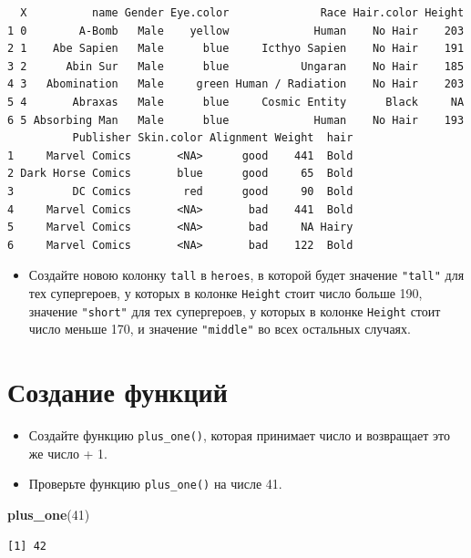 \documentclass[
]{book}
\newenvironment{Shaded}{\begin{snugshade}}{\end{snugshade}}
\newcommand{\DecValTok}[1]{\textcolor[rgb]{0.00,0.00,0.81}{#1}}
\newcommand{\KeywordTok}[1]{\textcolor[rgb]{0.13,0.29,0.53}{\textbf{#1}}}
\newcommand{\NormalTok}[1]{#1}
\providecommand{\tightlist}{%
  \setlength{\itemsep}{0pt}\setlength{\parskip}{0pt}}
\begin{document}
\begin{verbatim}
  X          name Gender Eye.color              Race Hair.color Height
1 0        A-Bomb   Male    yellow             Human    No Hair    203
2 1    Abe Sapien   Male      blue     Icthyo Sapien    No Hair    191
3 2      Abin Sur   Male      blue           Ungaran    No Hair    185
4 3   Abomination   Male     green Human / Radiation    No Hair    203
5 4       Abraxas   Male      blue     Cosmic Entity      Black     NA
6 5 Absorbing Man   Male      blue             Human    No Hair    193
          Publisher Skin.color Alignment Weight  hair
1     Marvel Comics       <NA>      good    441  Bold
2 Dark Horse Comics       blue      good     65  Bold
3         DC Comics        red      good     90  Bold
4     Marvel Comics       <NA>       bad    441  Bold
5     Marvel Comics       <NA>       bad     NA Hairy
6     Marvel Comics       <NA>       bad    122  Bold
\end{verbatim}

\begin{itemize}
\tightlist
\item
  Создайте новою колонку \texttt{tall} в \texttt{heroes}, в которой будет значение \texttt{"tall"} для тех супергероев, у которых в колонке \texttt{Height} стоит число больше 190, значение \texttt{"short"} для тех супергероев, у которых в колонке \texttt{Height} стоит число меньше 170, и значение \texttt{"middle"} во всех остальных случаях.
\end{itemize}

\hypertarget{task_function}{%
\section{Создание функций}\label{task_function}}

\begin{itemize}
\item
  Создайте функцию \texttt{plus\_one()}, которая принимает число и возвращает это же число + 1.
\item
  Проверьте функцию \texttt{plus\_one()} на числе 41.
\end{itemize}

\begin{Shaded}
\begin{Highlighting}[]
\KeywordTok{plus_one}\NormalTok{(}\DecValTok{41}\NormalTok{)}
\end{Highlighting}
\end{Shaded}

\begin{verbatim}
[1] 42
\end{verbatim}
\end{document}
